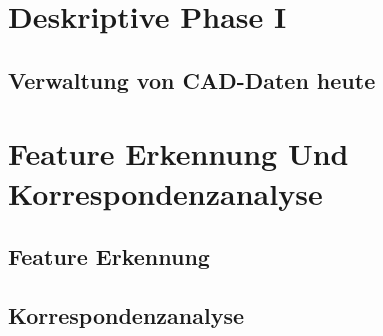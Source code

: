
\section{Deskriptive Phase I}
\label{kap:DeskriptivePhaseI}

\subsection{Verwaltung von CAD-Daten heute}
\label{kap:CADheute}


\clearpage
\section{Feature Erkennung Und Korrespondenzanalyse}
\label{kap:FeatureErkennungUndKorrespondenzanalyse}

\subsection{Feature Erkennung}
\label{kap:FeatureErkennung}

\subsection{Korrespondenzanalyse}
\label{kap:Korrespondenzanalyse}
\clearpage